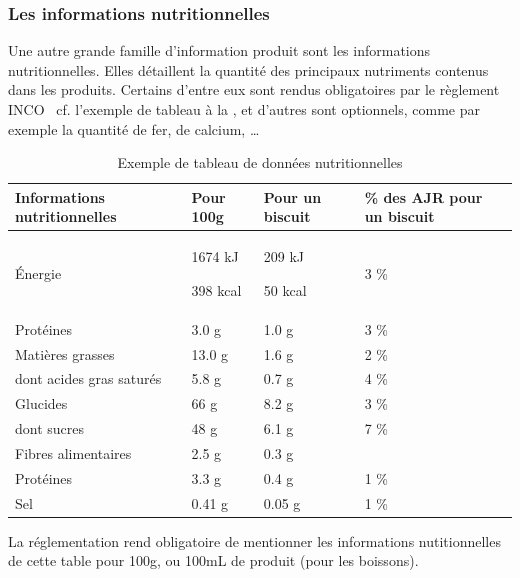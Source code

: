                 \subsubsection{Les informations nutritionnelles}

                Une autre grande famille d'information produit sont les informations nutritionnelles. 
                Elles détaillent la quantité des principaux nutriments contenus dans les produits.
                Certains d'entre eux sont rendus obligatoires par le règlement INCO~\cite{incotext}\cite{incoexpl} cf. l'exemple de tableau à la , et d'autres sont optionnels, comme par exemple la quantité de fer, de calcium, \dots

                \begin{table}[htbp]
                    \begin{center}
                    \begin{tabularx}{\linewidth}{|X|X|X|X|}
                        \hline
                        \textbf{Informations nutritionnelles} & \textbf{Pour 100g} & \textbf{Pour un biscuit} & \textbf{\% des AJR pour un biscuit} \\
                        \hline
                        \'{E}nergie &1674 kJ
                        
                        398 kcal & 209 kJ
                        
                        50 kcal & 3 \% \\
                        \hline
                        Protéines & 3.0 g & 1.0 g & 3 \% \\ 
                        \hline
                        Matières grasses & 13.0 g & 1.6 g & 2 \% \\
                        \hline
                        dont acides gras saturés & 5.8 g & 0.7 g & 4 \% \\
                        \hline
                        Glucides & 66 g & 8.2 g & 3 \% \\
                        \hline
                        dont sucres & 48 g & 6.1 g & 7 \% \\
                        \hline
                        Fibres alimentaires & 2.5 g & 0.3 g &\\
                        \hline
                        Protéines & 3.3 g & 0.4 g & 1 \% \\
                        \hline
                        Sel & 0.41 g & 0.05 g & 1 \% \\
                        \hline
                    \end{tabularx}
                    \end{center}
                    \caption{Exemple de tableau de données nutritionnelles}
                    \label{tab:donnees_nut}
                \end{table}
                La réglementation rend obligatoire de mentionner les informations nutitionnelles de cette table pour 100g, ou 100mL de produit (pour les boissons).

